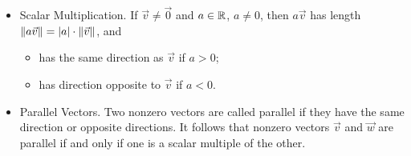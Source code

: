 \documentclass[pdf]{beamer}
\begin{document}
{{\begin{block}{}
\begin{itemize}
\item
\alert{Scalar Multiplication.}
If $\vec{v}\neq\vec{0}$ and $a\in\mathbb{R}$, $a\neq 0$,
then $a\vec{v}$ has length 
$\| a\vec{v}\|=|a|\cdot \|\vec{v}\|$, and
\pause
\begin{itemize}
\item has the same direction as $\vec{v}$ if $a>0$;
\pause
\item has direction opposite to $\vec{v}$ if $a<0$.
\end{itemize}
\pause
\item
\alert{Parallel Vectors.}
Two nonzero vectors are called \alert{parallel} if 
they have the same direction or opposite directions.
\pause
It follows that nonzero vectors \alert{$\vec{v}$ and $\vec{w}$ are parallel
if and only if one is a scalar multiple of the other.}
\end{itemize}
\end{block}
}


}
\end{document}
